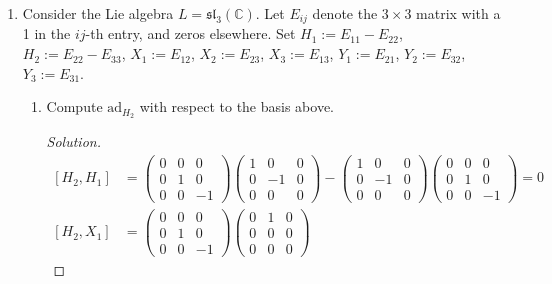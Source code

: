 \documentclass[12pt]{article}
\theoremstyle{definition}
\newenvironment{solution}
{\renewcommand\qedsymbol{$\blacksquare$}\begin{proof}[Solution]}
{\end{proof}}
\begin{document}
\begin{enumerate}
\begin{enumerate}
\begin{solution}
\begin{equation*}
                        \end{equation*}
                        Finally, with $\mathbb{C}^4$ as our
                        $\mathfrak{o}_4(\mathbb{C})$-module, then we conclude
                        that the natural module is 4 dimensional.
                    \end{solution}
            \end{enumerate}
        \item Consider the Lie algebra $L=\mathfrak{sl}_3(\mathbb{C})$. Let
            $E_{ij}$ denote the $3\times 3$ matrix with a 1 in the $ij$-th
            entry, and zeros elsewhere. Set $H_1:=E_{11}-E_{22}$,
            $H_2:=E_{22}-E_{33}$, $X_1:=E_{12}$, $X_2:=E_{23}$,
            $X_{3}:=E_{13}$, $Y_1:=E_{21}$, $Y_2:=E_{32}$, $Y_3:=E_{31}$.
            \begin{enumerate}[label=(\alph*)]
                \item Compute $\text{ad}_{H_2}$ with respect to the basis above.
                    \begin{solution}
                        \begin{equation*}
                            \begin{split}
                                [H_2, H_1] &=
                                \begin{pmatrix}0&0&0\\0&1&0\\0&0&-1
                                \end{pmatrix}\begin{pmatrix}1&0&0\\0&-1&0\\0&0&0
                                \end{pmatrix}-\begin{pmatrix}1&0&0\\0&-1&0\\0&0&0\end{pmatrix}
                                \begin{pmatrix}0&0&0\\0&1&0\\0&0&-1
                                \end{pmatrix}=0 \\
                                [H_2, X_1] &=
                                \begin{pmatrix}0&0&0\\0&1&0\\0&0&-1
                                \end{pmatrix}\begin{pmatrix}0&1&0\\0&0&0\\0&0&0

\end{pmatrix}
\end{split}
\end{equation*}
\end{solution}
\end{enumerate}
\end{enumerate}
\end{document}

